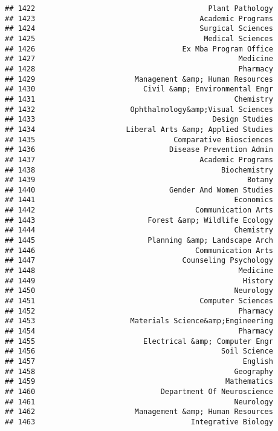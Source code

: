 \documentclass[
]{article}
\begin{document}
\begin{verbatim}
## 1422                                        Plant Pathology
## 1423                                      Academic Programs
## 1424                                      Surgical Sciences
## 1425                                       Medical Sciences
## 1426                                  Ex Mba Program Office
## 1427                                               Medicine
## 1428                                               Pharmacy
## 1429                       Management &amp; Human Resources
## 1430                         Civil &amp; Environmental Engr
## 1431                                              Chemistry
## 1432                      Ophthalmology&amp;Visual Sciences
## 1433                                         Design Studies
## 1434                     Liberal Arts &amp; Applied Studies
## 1435                                Comparative Biosciences
## 1436                               Disease Prevention Admin
## 1437                                      Academic Programs
## 1438                                           Biochemistry
## 1439                                                 Botany
## 1440                               Gender And Women Studies
## 1441                                              Economics
## 1442                                     Communication Arts
## 1443                          Forest &amp; Wildlife Ecology
## 1444                                              Chemistry
## 1445                          Planning &amp; Landscape Arch
## 1446                                     Communication Arts
## 1447                                  Counseling Psychology
## 1448                                               Medicine
## 1449                                                History
## 1450                                              Neurology
## 1451                                      Computer Sciences
## 1452                                               Pharmacy
## 1453                      Materials Science&amp;Engineering
## 1454                                               Pharmacy
## 1455                         Electrical &amp; Computer Engr
## 1456                                           Soil Science
## 1457                                                English
## 1458                                              Geography
## 1459                                            Mathematics
## 1460                             Department Of Neuroscience
## 1461                                              Neurology
## 1462                       Management &amp; Human Resources
## 1463                                    Integrative Biology

\end{verbatim}
\end{document}
